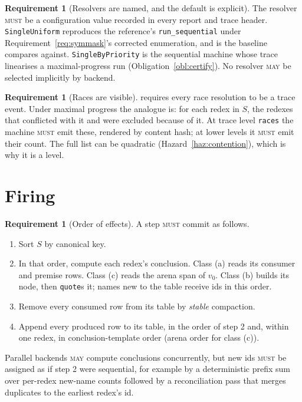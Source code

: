\documentclass[11pt,a4paper]{article}
\newcommand{\code}[1]{\texttt{#1}}
\newcommand{\MUST}{\textsc{must}}
\newcommand{\MAY}{\textsc{may}}
\theoremstyle{definition}
\newtheorem{requirement}[definition]{Requirement}
\theoremstyle{plain}
\begin{document}
\begin{requirement}[Resolvers are named, and the default is explicit]
\label{req:resolver}
The resolver \MUST{} be a configuration value recorded in every report and
trace header. \code{SingleUniform} reproduces the reference's
\code{run\_sequential} under Requirement~\ref{req:symmask}'s corrected
enumeration, and is the baseline \cite[Obl.~13.1]{matnote} compares against.
\code{SingleByPriority} is the sequential machine whose trace linearises a
maximal-progress run (Obligation~\ref{obl:certify}). No resolver \MAY{} be
selected implicitly by backend.
\end{requirement}

\begin{requirement}[Races are visible]\label{req:races}
\cite[Req.~8.6]{combspec} requires every race resolution to be a trace event.
Under maximal progress the analogue is: for each redex in $S$, the redexes
that conflicted with it and were excluded because of it. At trace level
\code{races} the machine \MUST{} emit these, rendered by content hash; at
lower levels it \MUST{} emit their count. The full list can be quadratic
(Hazard~\ref{haz:contention}), which is why it is a level.
\end{requirement}

\section{Firing}\label{sec:fire}

\begin{requirement}[Order of effects]\label{req:insertorder}
A step \MUST{} commit as follows.
\begin{enumerate}[leftmargin=1.6em]
\item Sort $S$ by canonical key.
\item In that order, compute each redex's conclusion. Class (a) reads its
consumer and premise rows. Class (c) reads the arena span of $v_{0}$. Class
(b) builds its node, then \code{quote}s it; names new to the table receive
ids in this order.
\item Remove every consumed row from its table by \emph{stable} compaction.
\item Append every produced row to its table, in the order of step 2 and,
within one redex, in conclusion-template order (arena order for class (c)).
\end{enumerate}
Parallel backends \MAY{} compute conclusions concurrently, but new ids
\MUST{} be assigned as if step 2 were sequential, for example by a
deterministic prefix sum over per-redex new-name counts followed by a
reconciliation pass that merges duplicates to the earliest redex's id.
\end{requirement}
\end{document}
